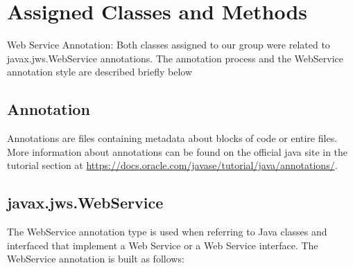 \section{Assigned Classes and Methods}

Web Service Annotation: Both classes assigned to our group were related to javax.jws.WebService annotations.
The annotation process and the WebService annotation style are described briefly below
\subsection{Annotation}
	Annotations are files containing metadata about blocks of code or entire files. More information about annotations can be found on 
	the official java site in the tutorial section at \url{https://docs.oracle.com/javase/tutorial/java/annotations/}.
\newpage
\subsection{javax.jws.WebService}
	The WebService annotation type is used when referring to Java classes and interfaced that implement a Web Service or a Web Service interface.
	The WebService annotation is built as follows: \\
	
